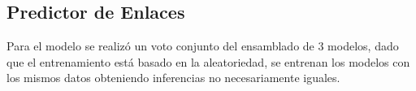 \documentclass[a4paper,11pt,twocolumn,twoside]{article}
\begin{document}
\subsection{Predictor de Enlaces}


Para el modelo se realizó un voto conjunto del ensamblado de 3 modelos, dado que el entrenamiento 
está basado en la aleatoriedad, se entrenan los modelos con los mismos datos obteniendo inferencias no
necesariamente iguales.


\end{document}
